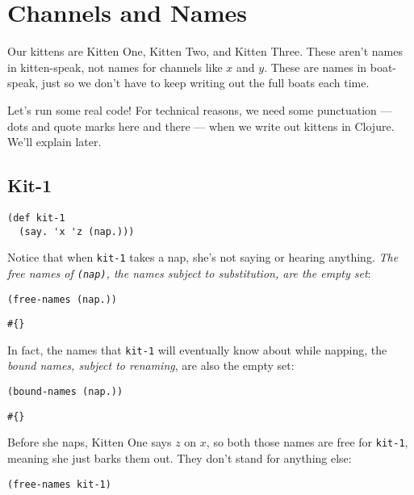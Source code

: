 \documentclass[10pt,oneside,x11names]{article}
\theoremstyle{definition}
\theoremstyle{warning}
\begin{document}
\newpage
\section{Channels and Names}
\label{sec:org5246fce}

Our kittens are Kitten One, Kitten Two, and Kitten Three. These
aren't names in kitten-speak, not names for channels like \(x\) and
\(y\). These are names in boat-speak, just so we don't have to keep
writing out the full boats each time.

Let's run some real code! For technical reasons, we need some
punctuation --- dots and quote marks here and there --- when we
write out kittens in Clojure. We'll explain later.

\subsection{Kit-1}
\label{sec:orga3e51ae}

\vskip 0.26cm
\begin{verbatim}
(def kit-1
  (say. 'x 'z (nap.)))
\end{verbatim}

Notice that when \texttt{kit-1} takes a nap, she's not saying or hearing
anything. \emph{The free names of \texttt{(nap)}, the names subject to
substitution, are the empty set}:

\vskip 0.26cm
\begin{verbatim}
(free-names (nap.))
\end{verbatim}

\begin{verbatim}
#{}
\end{verbatim}


In fact, the names that \texttt{kit-1} will eventually know about while
napping, the \emph{bound names, subject to renaming}, are also the
empty set:

\vskip 0.26cm
\begin{verbatim}
(bound-names (nap.))
\end{verbatim}

\begin{verbatim}
#{}
\end{verbatim}


Before she naps, Kitten One says \(z\) on \(x\), so both those names
are free for \texttt{kit-1}, meaning she just barks them out. They don't
stand for anything else:

\vskip 0.26cm
\begin{verbatim}
(free-names kit-1)
\end{verbatim}
\end{document}
